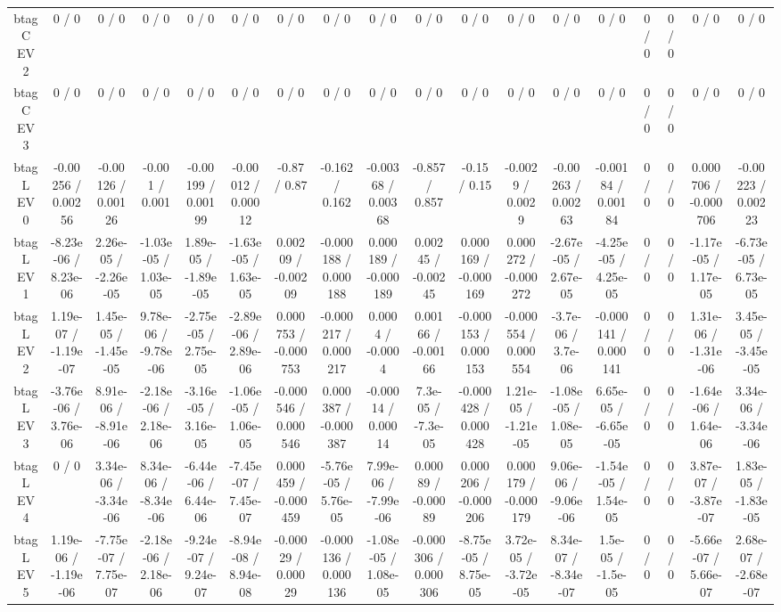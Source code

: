 \documentclass[10pt]{article}
\begin{document}
\begin{table}[htbp]
\begin{center}
\begin{tabular}{|c|c|c|c|c|c|c|c|c|c|c|c|c|c|c|c|c|c|}
  btag C EV 2 & 0 / 0 & 0 / 0 & 0 / 0 & 0 / 0 & 0 / 0 & 0 / 0 & 0 / 0 & 0 / 0 & 0 / 0 & 0 / 0 & 0 / 0 & 0 / 0 & 0 / 0 & 0 / 0 & 0 / 0 & 0 / 0 & 0 / 0 \\ 
  btag C EV 3 & 0 / 0 & 0 / 0 & 0 / 0 & 0 / 0 & 0 / 0 & 0 / 0 & 0 / 0 & 0 / 0 & 0 / 0 & 0 / 0 & 0 / 0 & 0 / 0 & 0 / 0 & 0 / 0 & 0 / 0 & 0 / 0 & 0 / 0 \\ 
  btag L EV 0 & -0.00256 / 0.00256 & -0.00126 / 0.00126 & -0.001 / 0.001 & -0.00199 / 0.00199 & -0.00012 / 0.00012 & -0.87 / 0.87 & -0.162 / 0.162 & -0.00368 / 0.00368 & -0.857 / 0.857 & -0.15 / 0.15 & -0.0029 / 0.0029 & -0.00263 / 0.00263 & -0.00184 / 0.00184 & 0 / 0 & 0 / 0 & 0.000706 / -0.000706 & -0.00223 / 0.00223 \\ 
  btag L EV 1 & -8.23e-06 / 8.23e-06 & 2.26e-05 / -2.26e-05 & -1.03e-05 / 1.03e-05 & 1.89e-05 / -1.89e-05 & -1.63e-05 / 1.63e-05 & 0.00209 / -0.00209 & -0.000188 / 0.000188 & 0.000189 / -0.000189 & 0.00245 / -0.00245 & 0.000169 / -0.000169 & 0.000272 / -0.000272 & -2.67e-05 / 2.67e-05 & -4.25e-05 / 4.25e-05 & 0 / 0 & 0 / 0 & -1.17e-05 / 1.17e-05 & -6.73e-05 / 6.73e-05 \\ 
  btag L EV 2 & 1.19e-07 / -1.19e-07 & 1.45e-05 / -1.45e-05 & 9.78e-06 / -9.78e-06 & -2.75e-05 / 2.75e-05 & -2.89e-06 / 2.89e-06 & 0.000753 / -0.000753 & -0.000217 / 0.000217 & 0.0004 / -0.0004 & 0.00166 / -0.00166 & -0.000153 / 0.000153 & -0.000554 / 0.000554 & -3.7e-06 / 3.7e-06 & -0.000141 / 0.000141 & 0 / 0 & 0 / 0 & 1.31e-06 / -1.31e-06 & 3.45e-05 / -3.45e-05 \\ 
  btag L EV 3 & -3.76e-06 / 3.76e-06 & 8.91e-06 / -8.91e-06 & -2.18e-06 / 2.18e-06 & -3.16e-05 / 3.16e-05 & -1.06e-05 / 1.06e-05 & -0.000546 / 0.000546 & 0.000387 / -0.000387 & -0.00014 / 0.00014 & 7.3e-05 / -7.3e-05 & -0.000428 / 0.000428 & 1.21e-05 / -1.21e-05 & -1.08e-05 / 1.08e-05 & 6.65e-05 / -6.65e-05 & 0 / 0 & 0 / 0 & -1.64e-06 / 1.64e-06 & 3.34e-06 / -3.34e-06 \\ 
  btag L EV 4 & 0 / 0 & 3.34e-06 / -3.34e-06 & 8.34e-06 / -8.34e-06 & -6.44e-06 / 6.44e-06 & -7.45e-07 / 7.45e-07 & 0.000459 / -0.000459 & -5.76e-05 / 5.76e-05 & 7.99e-06 / -7.99e-06 & 0.00089 / -0.00089 & 0.000206 / -0.000206 & 0.000179 / -0.000179 & 9.06e-06 / -9.06e-06 & -1.54e-05 / 1.54e-05 & 0 / 0 & 0 / 0 & 3.87e-07 / -3.87e-07 & 1.83e-05 / -1.83e-05 \\ 
  btag L EV 5 & 1.19e-06 / -1.19e-06 & -7.75e-07 / 7.75e-07 & -2.18e-06 / 2.18e-06 & -9.24e-07 / 9.24e-07 & -8.94e-08 / 8.94e-08 & -0.00029 / 0.00029 & -0.000136 / 0.000136 & -1.08e-05 / 1.08e-05 & -0.000306 / 0.000306 & -8.75e-05 / 8.75e-05 & 3.72e-05 / -3.72e-05 & 8.34e-07 / -8.34e-07 & 1.5e-05 / -1.5e-05 & 0 / 0 & 0 / 0 & -5.66e-07 / 5.66e-07 & 2.68e-07 / -2.68e-07 \\ 

\end{tabular}
\end{center}
\end{table}
\end{document}
